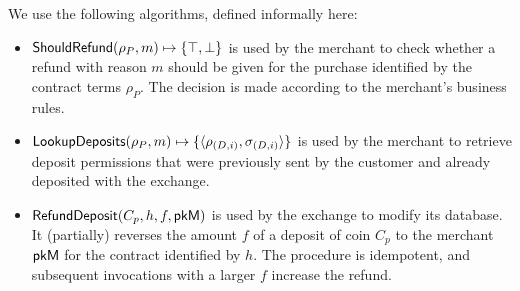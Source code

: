 We use the following algorithms, defined informally here:
\begin{itemize}
 \item $\mathsf{ShouldRefund}(\rho_P, m) \mapsto \{ \top, \bot \}$ is used by the merchant to
   check whether a refund with reason $m$ should be given for the purchase identified by the
    contract terms $\rho_P$.  The decision is made according to the merchant's business rules.
  \item $\mathsf{LookupDeposits}(\rho_P, m) \mapsto \{ \langle \rho_{(D,i)},
    \sigma_{(D,i)} \rangle \}$ is used by the merchant to retrieve deposit
    permissions that were previously sent by the customer and already deposited
    with the exchange.
  \item $\mathsf{RefundDeposit}(C_p, h, f, \mathsf{pkM})$ is used by the exchange to
    modify its database.  It (partially) reverses the amount $f$ of a deposit
    of coin $C_p$ to the merchant $\mathsf{pkM}$ for the contract identified by $h$.
    The procedure is idempotent, and subsequent invocations with a larger $f$
    increase the refund.
\end{itemize}

